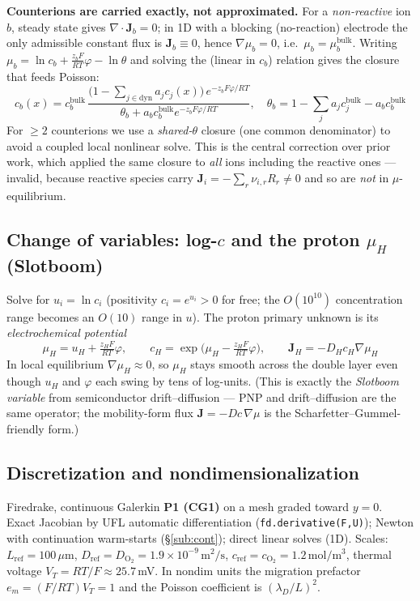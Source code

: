 \documentclass[11pt]{article}
\newcommand{\VT}{V_{T}}
\newcommand{\Jbf}{\mathbf{J}}
\newcommand{\dyn}{\mathrm{dyn}}
\newcommand{\bulk}{\mathrm{bulk}}
\begin{document}
\textbf{Counterions are carried exactly, not approximated.} For a
\emph{non-reactive} ion $b$, steady state gives $\nabla\!\cdot\Jbf_b=0$;
in 1D with a blocking (no-reaction) electrode the only admissible constant
flux is $\Jbf_b\equiv0$, hence $\nabla\mu_b=0$, i.e.\ $\mu_b=\mu_b^{\bulk}$.
Writing $\mu_b=\ln c_b + \tfrac{z_b F}{RT}\varphi-\ln\theta$ and solving the
(linear in $c_b$) relation gives the closure that feeds Poisson:
\[
  \boxed{\;c_b(x) = c_b^{\bulk}\,
   \frac{\bigl(1-\sum_{j\in\dyn}a_j c_j(x)\bigr)\,e^{-z_b F\varphi/RT}}
        {\theta_b + a_b c_b^{\bulk}e^{-z_b F\varphi/RT}},
   \quad \theta_b = 1-\sum_j a_j c_j^{\bulk}-a_b c_b^{\bulk}\;}
\]
For $\geq2$ counterions we use a \emph{shared-$\theta$} closure (one common
denominator) to avoid a coupled local nonlinear solve. This is the central
correction over prior work, which applied the same closure to \emph{all}
ions including the reactive ones --- invalid, because reactive species carry
$\Jbf_i=-\sum_r\nu_{i,r}R_r\neq0$ and so are \emph{not} in $\mu$-equilibrium.

\subsection{Change of variables: log-$c$ and the proton $\mu_H$ (Slotboom)}
Solve for $u_i=\ln c_i$ (positivity $c_i=e^{u_i}>0$ for free; the
$O(10^{10})$ concentration range becomes an $O(10)$ range in $u$). The
proton primary unknown is its \emph{electrochemical potential}
\[
  \boxed{\;\mu_H = u_H + \tfrac{z_H F}{RT}\varphi,\qquad
   c_H = \exp\!\bigl(\mu_H-\tfrac{z_H F}{RT}\varphi\bigr),\qquad
   \Jbf_H=-D_H c_H\nabla\mu_H\;}
\]
In local equilibrium $\nabla\mu_H\approx0$, so $\mu_H$ stays smooth across
the double layer even though $u_H$ and $\varphi$ each swing by tens of
log-units. (This is exactly the \emph{Slotboom variable} from
semiconductor drift--diffusion --- PNP and drift--diffusion are the same
operator; the mobility-form flux $\Jbf=-Dc\,\nabla\mu$ is the
Scharfetter--Gummel-friendly form.)

\subsection{Discretization and nondimensionalization}
Firedrake, continuous Galerkin \textbf{P1 (CG1)} on a mesh graded toward
$y=0$. Exact Jacobian by UFL automatic differentiation
(\texttt{fd.derivative(F,U)}); Newton with continuation warm-starts
(\S\ref{sub:cont}); direct linear solves (1D). Scales: $L_{\mathrm{ref}}=
100\,\mu$m, $D_{\mathrm{ref}}=D_{\mathrm{O_2}}=1.9\times10^{-9}\,
\mathrm{m^2/s}$, $c_{\mathrm{ref}}=c_{\mathrm{O_2}}=1.2\,\mathrm{mol/m^3}$,
thermal voltage $\VT=RT/F\approx25.7\,$mV. In nondim units the migration
prefactor $e_m=(F/RT)\VT=1$ and the Poisson coefficient is
$(\lambda_D/L)^2$.
\end{document}
